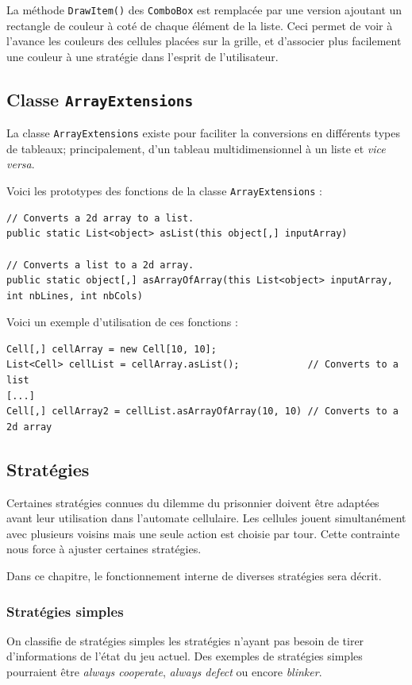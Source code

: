 \documentclass[a4paper]{article}
\begin{document}
La méthode \texttt{DrawItem()} des \texttt{ComboBox} est remplacée par une version ajoutant un rectangle de couleur à coté de chaque élément de la liste. Ceci permet de voir à l'avance les couleurs des cellules placées sur la grille, et d'associer plus facilement une couleur à une stratégie dans l'esprit de l'utilisateur.

\subsection{Classe \texttt{ArrayExtensions}}
La classe \texttt{ArrayExtensions} existe pour faciliter la conversions en différents types de tableaux; principalement, d'un tableau multidimensionnel à un liste et \textit{vice versa}.

Voici les prototypes des fonctions de la classe \texttt{ArrayExtensions} : 

\begin{lstlisting}
// Converts a 2d array to a list.
public static List<object> asList(this object[,] inputArray)

// Converts a list to a 2d array.
public static object[,] asArrayOfArray(this List<object> inputArray, int nbLines, int nbCols)
\end{lstlisting}

Voici un exemple d'utilisation de ces fonctions :
\begin{lstlisting}
Cell[,] cellArray = new Cell[10, 10];
List<Cell> cellList = cellArray.asList();            // Converts to a list
[...]
Cell[,] cellArray2 = cellList.asArrayOfArray(10, 10) // Converts to a 2d array
\end{lstlisting}

\pagebreak
\subsection{Stratégies}
Certaines stratégies connues du dilemme du prisonnier doivent être adaptées avant leur utilisation dans l'automate cellulaire. Les cellules jouent simultanément avec plusieurs voisins mais une seule action est choisie par tour. Cette contrainte nous force à ajuster certaines stratégies.

Dans ce chapitre, le fonctionnement interne de diverses stratégies sera décrit.

\subsubsection{Stratégies simples}
On classifie de stratégies simples les stratégies n'ayant pas besoin de tirer d'informations de l'état du jeu actuel. Des exemples de stratégies simples pourraient être \textit{always cooperate}, \textit{always defect} ou encore \textit{blinker}.
\end{document}
